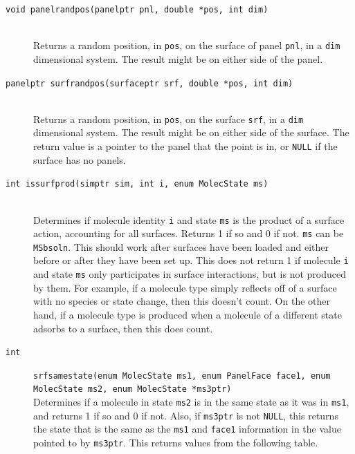 \documentclass {scrbook}
\newcommand {\ttt} {\texttt}
\begin{document}
\begin{description}
\item[\ttt{void panelrandpos(panelptr pnl, double *pos, int dim)}]
\hfill \\
Returns a random position, in \ttt{pos}, on the surface of panel \ttt{pnl}, in a \ttt{dim} dimensional system. The result might be on either side of the panel.

\item[\ttt{panelptr surfrandpos(surfaceptr srf, double *pos, int dim)}]
\hfill \\
Returns a random position, in \ttt{pos}, on the surface \ttt{srf}, in a \ttt{dim} dimensional system. The result might be on either side of the surface. The return value is a pointer to the panel that the point is in, or \ttt{NULL} if the surface has no panels.

\item[\ttt{int issurfprod(simptr sim, int i, enum MolecState ms)}]
\hfill \\
Determines if molecule identity \ttt{i} and state \ttt{ms} is the product of a surface action, accounting for all surfaces. Returns 1 if so and 0 if not. \ttt{ms} can be \ttt{MSbsoln}. This should work after surfaces have been loaded and either before or after they have been set up. This does not return 1 if molecule \ttt{i} and state \ttt{ms} only participates in surface interactions, but is not produced by them. For example, if a molecule type simply reflects off of a surface with no species or state change, then this doesn't count. On the other hand, if a molecule type is produced when a molecule of a different state adsorbs to a surface, then this does count.

\item[\ttt{int}]
\ttt{srfsamestate(enum MolecState ms1, enum PanelFace face1, enum MolecState ms2, enum MolecState *ms3ptr)}
\hfill \\
Determines if a molecule in state \ttt{ms2} is in the same state as it was in \ttt{ms1}, and returns 1 if so and 0 if not. Also, if \ttt{ms3ptr} is not \ttt{NULL}, this returns the state that is the same as the \ttt{ms1} and \ttt{face1} information in the value pointed to by \ttt{ms3ptr}. This returns values from the following table.


\end{description}
\end{document}
